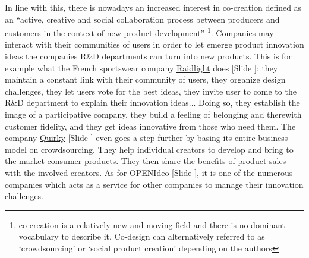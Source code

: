 \documentclass{article}
\newcounter{slide}
\begin{document}
In line with this, there is nowadays an increased interest in co-creation defined as an ``active, creative and social collaboration process between producers and customers in the context of new product development'' \cite{pillerSocialMediaSocial2011} \footnote{co-creation is a relatively new and moving field and there is no dominant vocabulary to describe it. Co-design can alternatively referred to as `crowdsourcing' or `social product creation' depending on the authors}. Companies may interact with their communities of users in order to let emerge product innovation ideas the companies R\&D departments can turn into new products. This is for example what the French sportswear company \href{https://team.fr.raidlight.com/categories/atelier-de-conception-ouvert-a-tous.369/}{Raidlight} does {\color{blue}[Slide ]}: they maintain a constant link with their community of users, they organize design challenges, they let users vote for the best ideas, they invite user to come to the R\&D department to explain their innovation ideas... Doing so, they establish the image of a participative company, they build a feeling of belonging and therewith customer fidelity, and they get ideas innovative from those who need them. The company \href{https://quirky.com}{Quirky} {\color{blue}[Slide ]} even goes a step further by basing its entire business model on crowdsourcing. They help individual creators to develop and bring to the market consumer products. They then share the benefits of product sales with the involved creators. As for \href{https://www.openideo.com/}{OPENIdeo} {\color{blue}[Slide ]}, it is one of the numerous companies which acts as a service for other companies to manage their innovation challenges. 

\end{document}
